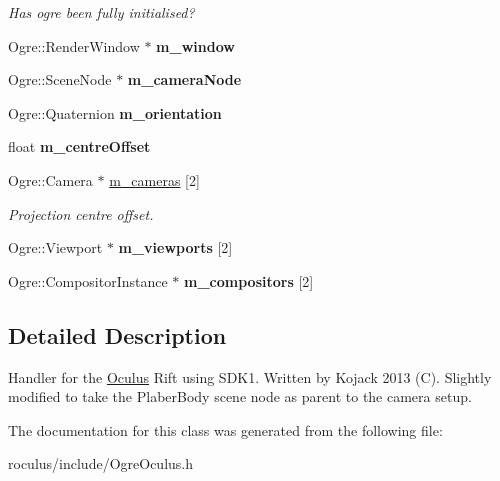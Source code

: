 \begin{DoxyCompactItemize}
\begin{DoxyCompactList}\small\item\em \-Has ogre been fully initialised? \end{DoxyCompactList}\item 
\hypertarget{classOculus_a1ac55f89c6d988f8377dc11209d2cf9d}{\-Ogre\-::\-Render\-Window $\ast$ {\bfseries m\-\_\-window}}\label{classOculus_a1ac55f89c6d988f8377dc11209d2cf9d}

\item 
\hypertarget{classOculus_a489d1f3bf93522faf43791955a6f61e9}{\-Ogre\-::\-Scene\-Node $\ast$ {\bfseries m\-\_\-camera\-Node}}\label{classOculus_a489d1f3bf93522faf43791955a6f61e9}

\item 
\hypertarget{classOculus_a22e177e8bffd008880590d3a4d644b9c}{\-Ogre\-::\-Quaternion {\bfseries m\-\_\-orientation}}\label{classOculus_a22e177e8bffd008880590d3a4d644b9c}

\item 
\hypertarget{classOculus_a0948264e389c8aa60f75610b604fa7a4}{float {\bfseries m\-\_\-centre\-Offset}}\label{classOculus_a0948264e389c8aa60f75610b604fa7a4}

\item 
\hypertarget{classOculus_afa92c115efd3146fe412a45efd513618}{\-Ogre\-::\-Camera $\ast$ \hyperlink{classOculus_afa92c115efd3146fe412a45efd513618}{m\-\_\-cameras} \mbox{[}2\mbox{]}}\label{classOculus_afa92c115efd3146fe412a45efd513618}

\begin{DoxyCompactList}\small\item\em \-Projection centre offset. \end{DoxyCompactList}\item 
\hypertarget{classOculus_a348c71e89c1fc6f0ffdd585605206d7c}{\-Ogre\-::\-Viewport $\ast$ {\bfseries m\-\_\-viewports} \mbox{[}2\mbox{]}}\label{classOculus_a348c71e89c1fc6f0ffdd585605206d7c}

\item 
\hypertarget{classOculus_a5b734ee68ae041602af9b55af2c5a2de}{\-Ogre\-::\-Compositor\-Instance $\ast$ {\bfseries m\-\_\-compositors} \mbox{[}2\mbox{]}}\label{classOculus_a5b734ee68ae041602af9b55af2c5a2de}

\end{DoxyCompactItemize}


\subsection{\-Detailed \-Description}
\-Handler for the \hyperlink{classOculus}{\-Oculus} \-Rift using \-S\-D\-K1. \-Written by \-Kojack 2013 (\-C). \-Slightly modified to take the \-Plaber\-Body scene node as parent to the camera setup. 

\-The documentation for this class was generated from the following file\-:\begin{DoxyCompactItemize}
\item 
roculus/include/\-Ogre\-Oculus.\-h\end{DoxyCompactItemize}
